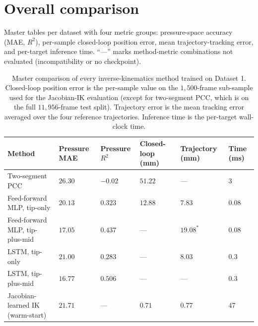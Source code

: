 \section{Overall comparison}
\label{sec:overall}

Master tables per dataset with four metric groups: pressure-space accuracy (MAE, $R^{2}$), per-sample closed-loop position error, mean trajectory-tracking error, and per-target inference time. ``---'' marks method-metric combinations not evaluated (incompatibility or no checkpoint).

\begin{table}[ht]
\centering
\caption[Master comparison on Dataset 1.]{Master comparison of every inverse-kinematics method trained on Dataset 1. Closed-loop position error is the per-sample value on the $1{,}500$-frame sub-sample used for the Jacobian-IK evaluation (except for two-segment PCC, which is on the full $11{,}956$-frame test split). Trajectory error is the mean tracking error averaged over the four reference trajectories. Inference time is the per-target wall-clock time.}
\label{tab:res_overall_ds1}
\begin{tabularx}{\linewidth}{@{}l X X X X X@{}}
\toprule
Method                                          & Pressure MAE      & Pressure $R^{2}$    & Closed-loop (mm)   & Trajectory (mm)            & Time (ms)           \\
\midrule
Two-segment PCC                                  & $26.30$            & $-0.02$              & $51.22$             & ---                         & $3$                  \\
Feed-forward MLP, tip-only                       & $20.13$            & $0.323$              & $12.88$             & $7.83$                      & $0.08$               \\
Feed-forward MLP, tip-plus-mid                   & $17.05$            & $0.437$              & ---                 & $19.08^{\ast}$              & $0.08$               \\
LSTM, tip-only                                   & $21.00$            & $0.283$              & ---                 & $8.03$                      & $0.3$                \\
LSTM, tip-plus-mid                               & $\mathbf{16.77}$   & $\mathbf{0.506}$     & ---                 & ---                         & $0.3$                \\
Jacobian-learned IK (warm-start)                 & $21.71$            & ---                  & $\mathbf{0.71}$     & $\mathbf{0.77}$             & $47$                 \\
\bottomrule
\end{tabularx}
\end{table}

